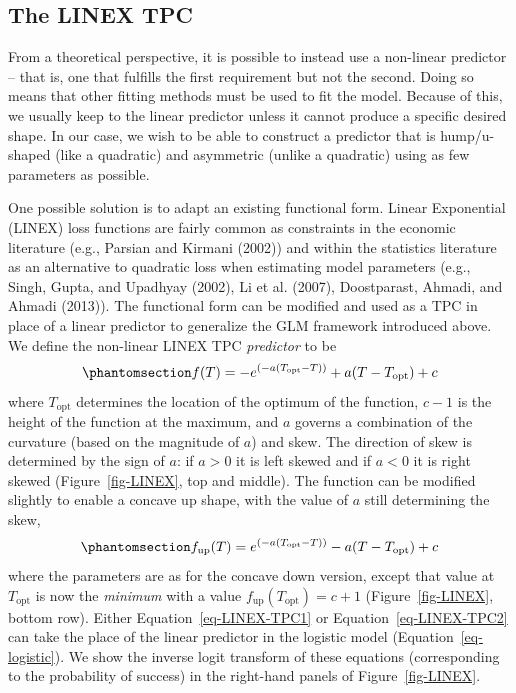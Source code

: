 \documentclass[
  12pt,
]{article}
\begin{document}
\subsection{The LINEX TPC}\label{the-linex-tpc}

From a theoretical perspective, it is possible to instead use a
non-linear predictor -- that is, one that fulfills the first requirement
but not the second. Doing so means that other fitting methods must be
used to fit the model. Because of this, we usually keep to the linear
predictor unless it cannot produce a specific desired shape. In our
case, we wish to be able to construct a predictor that is hump/u-shaped
(like a quadratic) and asymmetric (unlike a quadratic) using as few
parameters as possible.

One possible solution is to adapt an existing functional form. Linear
Exponential (LINEX) loss functions are fairly common as constraints in
the economic literature (e.g., Parsian and Kirmani (2002)) and within
the statistics literature as an alternative to quadratic loss when
estimating model parameters (e.g., Singh, Gupta, and Upadhyay (2002), Li
et al. (2007), Doostparast, Ahmadi, and Ahmadi (2013)). The functional
form can be modified and used as a TPC in place of a linear predictor to
generalize the GLM framework introduced above. We define the non-linear
LINEX TPC \emph{predictor} to be
\begin{equation}\phantomsection\label{eq-LINEX-TPC1}{
f(T) = - e^{(-a( T_{\mathrm{opt}} - T ) )} + a ( T - T_{\mathrm{opt}}) + c 
}\end{equation} where \(T_{\mathrm{opt}}\) determines the location of
the optimum of the function, \(c - 1\) is the height of the function at
the maximum, and \(a\) governs a combination of the curvature (based on
the magnitude of \(a\)) and skew. The direction of skew is determined by
the sign of \(a\): if \(a>0\) it is left skewed and if \(a<0\) it is
right skewed (Figure~\ref{fig-LINEX}, top and middle). The function can
be modified slightly to enable a concave up shape, with the value of
\(a\) still determining the skew,
\begin{equation}\phantomsection\label{eq-LINEX-TPC2}{
f_{\mathrm{up}}(T) = e^{(-a( T_{\mathrm{opt}} - T ) )} - a ( T - T_{\mathrm{opt}}) + c  
}\end{equation} where the parameters are as for the concave down
version, except that value at \(T_{\mathrm{opt}}\) is now the
\emph{minimum} with a value \(f_{\mathrm{up}}(T_{\mathrm{opt}}) = c+1\)
(Figure~\ref{fig-LINEX}, bottom row). Either
Equation~\ref{eq-LINEX-TPC1} or Equation~\ref{eq-LINEX-TPC2} can take
the place of the linear predictor in the logistic model
(Equation~\ref{eq-logistic}). We show the inverse logit transform of
these equations (corresponding to the probability of success) in the
right-hand panels of Figure~\ref{fig-LINEX}.
\end{document}
